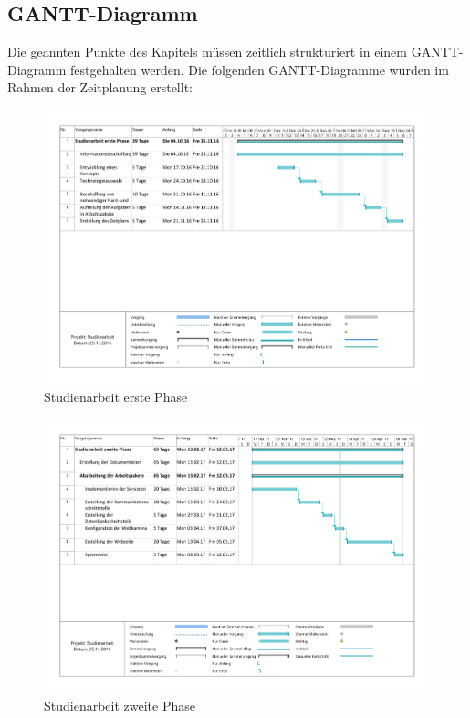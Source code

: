 \subsection{GANTT-Diagramm}
Die geannten Punkte des Kapitels  müssen zeitlich strukturiert in einem GANTT-Diagramm festgehalten werden.
Die folgenden GANTT-Diagramme wurden im Rahmen der Zeitplanung erstellt:
\begin{landscape}
	\begin{figure}[htb]
		\includegraphics[width=\linewidth, height=.9\textheight]{Bilder/GANTT/Studienarbeit_erste_Phase.pdf}
		\caption[GANTT-Diagramm: Studienarbeit erste Phase]{Studienarbeit erste Phase}
		\label{fig:Studienarbeit_erste_Phase}
	\end{figure}
\end{landscape}
\begin{landscape}
	\begin{figure}[htb]
		\includegraphics[width=\linewidth, height=.9\textheight]{Bilder/GANTT/Studienarbeit_zweite_Phase.pdf}
		\caption[GANTT-Diagramm: Studienarbeit zweite Phase]{Studienarbeit zweite Phase}
		\label{fig:Studienarbeit_zweite_Phase}
	\end{figure}
\end{landscape}


